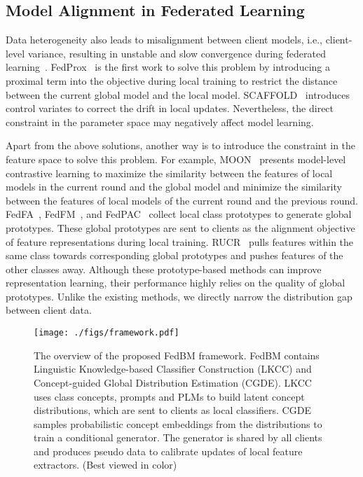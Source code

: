\subsection{Model Alignment in Federated Learning}
Data heterogeneity also leads to misalignment between client models, i.e., client-level variance,  resulting in unstable and slow convergence during federated learning~\cite{li2020federated}. 
FedProx~\cite{fedprox} is the first work to solve this problem by introducing a proximal term into the objective during local training to restrict the distance between the current global model and the local model.  SCAFFOLD~\cite{karimireddy2020scaffold} introduces control variates to correct the drift in local updates. Nevertheless, the direct constraint in the parameter space may negatively affect model learning. 

Apart from the above solutions, another way is to introduce the constraint in the feature space to solve this problem. For example,
MOON~\cite{li2021model} presents model-level contrastive learning to maximize the similarity between the features of local models in the current round and the global model and minimize the similarity between the features of local models of the current round and the previous round.  
FedFA~\cite{zhou2023fedfa}, FedFM~\cite{ye2023fedfm}, and FedPAC~\cite{xu2023personalized} collect local class prototypes to generate global prototypes. These global prototypes are sent to clients as the alignment objective of feature representations during local training. 
RUCR~\cite{huang2024federated} pulls features within the same class towards corresponding global prototypes and
pushes features of the other classes away.
Although these prototype-based methods can improve representation learning, their performance highly relies on the quality of global prototypes. Unlike the existing methods, we directly narrow the distribution gap between client data.
\begin{figure*}[!t]
\centering
\texttt{[image: ./figs/framework.pdf]}
\caption{The overview of the proposed FedBM framework. FedBM contains Linguistic Knowledge-based Classifier Construction (LKCC) and Concept-guided Global Distribution Estimation (CGDE). LKCC uses class concepts, prompts and PLMs to build latent concept distributions, which are sent to clients as local classifiers. CGDE samples probabilistic concept embeddings from the distributions to train a conditional generator. The generator is shared by all clients and produces pseudo data to calibrate updates of local feature extractors. (Best viewed in color) }
\label{framework}
\end{figure*}

